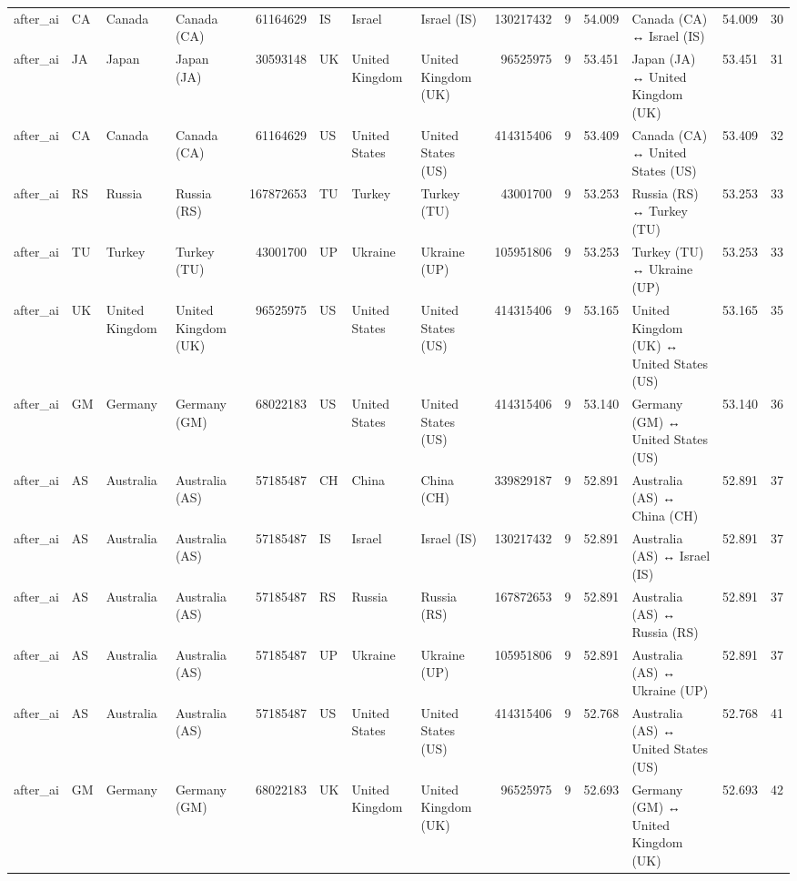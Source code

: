 \begin{tabular}{llllrlllrrrlrr}
after\_ai & CA & Canada & Canada (CA) & 61164629 & IS & Israel & Israel (IS) & 130217432 & 9 & 54.009 & Canada (CA) ↔ Israel (IS) & 54.009 & 30 \\
after\_ai & JA & Japan & Japan (JA) & 30593148 & UK & United Kingdom & United Kingdom (UK) & 96525975 & 9 & 53.451 & Japan (JA) ↔ United Kingdom (UK) & 53.451 & 31 \\
after\_ai & CA & Canada & Canada (CA) & 61164629 & US & United States & United States (US) & 414315406 & 9 & 53.409 & Canada (CA) ↔ United States (US) & 53.409 & 32 \\
after\_ai & RS & Russia & Russia (RS) & 167872653 & TU & Turkey & Turkey (TU) & 43001700 & 9 & 53.253 & Russia (RS) ↔ Turkey (TU) & 53.253 & 33 \\
after\_ai & TU & Turkey & Turkey (TU) & 43001700 & UP & Ukraine & Ukraine (UP) & 105951806 & 9 & 53.253 & Turkey (TU) ↔ Ukraine (UP) & 53.253 & 33 \\
after\_ai & UK & United Kingdom & United Kingdom (UK) & 96525975 & US & United States & United States (US) & 414315406 & 9 & 53.165 & United Kingdom (UK) ↔ United States (US) & 53.165 & 35 \\
after\_ai & GM & Germany & Germany (GM) & 68022183 & US & United States & United States (US) & 414315406 & 9 & 53.140 & Germany (GM) ↔ United States (US) & 53.140 & 36 \\
after\_ai & AS & Australia & Australia (AS) & 57185487 & CH & China & China (CH) & 339829187 & 9 & 52.891 & Australia (AS) ↔ China (CH) & 52.891 & 37 \\
after\_ai & AS & Australia & Australia (AS) & 57185487 & IS & Israel & Israel (IS) & 130217432 & 9 & 52.891 & Australia (AS) ↔ Israel (IS) & 52.891 & 37 \\
after\_ai & AS & Australia & Australia (AS) & 57185487 & RS & Russia & Russia (RS) & 167872653 & 9 & 52.891 & Australia (AS) ↔ Russia (RS) & 52.891 & 37 \\
after\_ai & AS & Australia & Australia (AS) & 57185487 & UP & Ukraine & Ukraine (UP) & 105951806 & 9 & 52.891 & Australia (AS) ↔ Ukraine (UP) & 52.891 & 37 \\
after\_ai & AS & Australia & Australia (AS) & 57185487 & US & United States & United States (US) & 414315406 & 9 & 52.768 & Australia (AS) ↔ United States (US) & 52.768 & 41 \\
after\_ai & GM & Germany & Germany (GM) & 68022183 & UK & United Kingdom & United Kingdom (UK) & 96525975 & 9 & 52.693 & Germany (GM) ↔ United Kingdom (UK) & 52.693 & 42 \\

\end{tabular}
